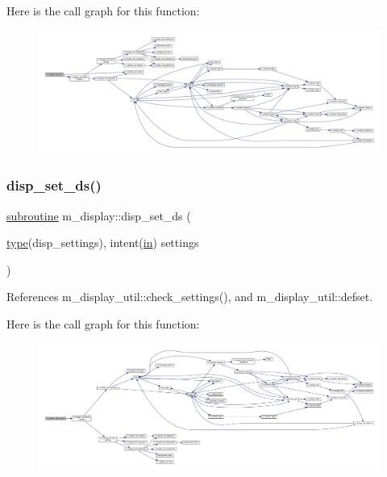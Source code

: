 Here is the call graph for this function\+:
\nopagebreak
\begin{figure}[H]
\begin{center}
\leavevmode
\includegraphics[width=350pt]{namespacem__display_aca571cfcf5dcced1070969200f717a28_cgraph}
\end{center}
\end{figure}
\mbox{\label{namespacem__display_a6296917336a62e43005e56c48340eaf1}} 
\subsubsection{\texorpdfstring{disp\+\_\+set\+\_\+ds()}{disp\_set\_ds()}}
{\footnotesize\ttfamily \hyperlink{M__stopwatch_83_8txt_acfbcff50169d691ff02d4a123ed70482}{subroutine} m\+\_\+display\+::disp\+\_\+set\+\_\+ds (\begin{DoxyParamCaption}\item[{\hyperlink{stop__watch_83_8txt_a70f0ead91c32e25323c03265aa302c1c}{type}(disp\+\_\+settings), intent(\hyperlink{M__journal_83_8txt_afce72651d1eed785a2132bee863b2f38}{in})}]{settings }\end{DoxyParamCaption})\hspace{0.3cm}{\ttfamily [private]}}



References m\+\_\+display\+\_\+util\+::check\+\_\+settings(), and m\+\_\+display\+\_\+util\+::defset.

Here is the call graph for this function\+:
\nopagebreak
\begin{figure}[H]
\begin{center}
\leavevmode
\includegraphics[width=350pt]{namespacem__display_a6296917336a62e43005e56c48340eaf1_cgraph}
\end{center}
\end{figure}
\mbox{\label{namespacem__display_a504ce34f82249882d1cc5a0ea2802bc6}} 
